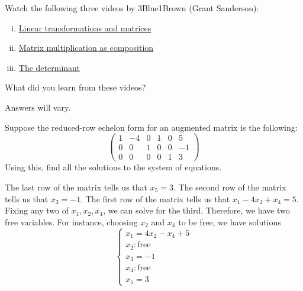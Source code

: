 \documentclass[11pt,letterpaper]{article}
\begin{document}

 Watch the following three videos by 3Blue1Brown (Grant Sanderson):
	\begin{enumerate}[(i)]
	\item \href{https://www.youtube.com/watch?v=kYB8IZa5AuE&list=PL0-GT3co4r2y2YErbmuJw2L5tW4Ew2O5B&index=4&ab_channel=3Blue1Brown}{Linear transformations and matrices}
	\item \href{https://www.youtube.com/watch?v=XkY2DOUCWMU&list=PL0-GT3co4r2y2YErbmuJw2L5tW4Ew2O5B&index=5&ab_channel=3Blue1Brown}{Matrix multiplication as composition}
	\item \href{https://www.youtube.com/watch?v=Ip3X9LOh2dk&list=PL0-GT3co4r2y2YErbmuJw2L5tW4Ew2O5B&index=7&ab_channel=3Blue1Brown}{The determinant}
	\end{enumerate}
What did you learn from these videos? \vfill


\begin{center} Answers will vary. \end{center} \vfill





\newpage





 Suppose the reduced-row echelon form for an augmented matrix is the following:
	\[
	\begin{pmatrix}
	1 & -4 & 0 & 1 & 0 & 5 \\
	0 & 0 & 1 & 0 & 0 & -1 \\
	0 & 0 & 0 & 0 & 1 & 3
	\end{pmatrix}
	\]
Using this, find all the solutions to the system of equations. \pspace

\sol The last row of the matrix tells us that $x_5= 3$. The second row of the matrix tells us that $x_3= -1$. The first row of the matrix tells us that $x_1 - 4x_2 + x_4= 5$. Fixing any two of $x_1, x_2, x_4$, we can solve for the third. Therefore, we have two free variables. For instance, choosing $x_2$ and $x_4$ to be free, we have solutions
	\[
	\begin{cases}
	x_1= 4x_2 - x_4 + 5 \\
	x_2: \text{free} \\
	x_3= -1 \\
	x_4: \text{free} \\
	x_5= 3
	\end{cases}
	\]
\end{document}
